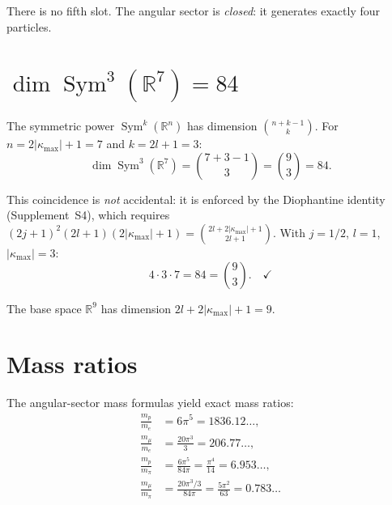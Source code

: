\documentclass[11pt,letterpaper]{article}
\numberwithin{equation}{section}
\begin{document}
There is no fifth slot. The angular sector is \emph{closed}: it generates
exactly four particles.

\section{$\dim\operatorname{Sym}^3(\mathbb{R}^7) = 84$}
\label{sec:sym3}

The symmetric power $\operatorname{Sym}^k(\mathbb{R}^n)$ has dimension
$\binom{n+k-1}{k}$. For $n = 2|\kappa_\mathrm{max}|+1 = 7$ and $k = 2l+1 = 3$:
\begin{equation}
\label{eq:sym3_dim}
  \dim\operatorname{Sym}^3(\mathbb{R}^7) = \binom{7+3-1}{3} = \binom{9}{3} = 84.
\end{equation}

This coincidence is \emph{not} accidental: it is enforced by the Diophantine
identity (Supplement~S4), which requires
$(2j+1)^2(2l+1)(2|\kappa_\mathrm{max}|+1) = \binom{2l+2|\kappa_\mathrm{max}|+1}{2l+1}$.
With $j = 1/2$, $l = 1$, $|\kappa_\mathrm{max}| = 3$:
\begin{equation}
  4 \cdot 3 \cdot 7 = 84 = \binom{9}{3}. \quad \checkmark
\end{equation}

The base space $\mathbb{R}^9$ has dimension $2l + 2|\kappa_\mathrm{max}| + 1 = 9$.

\section{Mass ratios}
\label{sec:ratios}

The angular-sector mass formulas yield exact mass ratios:
\begin{align}
  \frac{m_p}{m_e} &= 6\pi^5 = 1836.12\ldots, \label{eq:mp_me} \\
  \frac{m_\mu}{m_e} &= \frac{20\pi^3}{3} = 206.77\ldots, \label{eq:mmu_me} \\
  \frac{m_p}{m_\pi} &= \frac{6\pi^5}{84\pi} = \frac{\pi^4}{14} = 6.953\ldots, \label{eq:mp_mpi} \\
  \frac{m_\mu}{m_\pi} &= \frac{20\pi^3/3}{84\pi} = \frac{5\pi^2}{63} = 0.783\ldots \label{eq:mmu_mpi}
\end{align}
\end{document}

